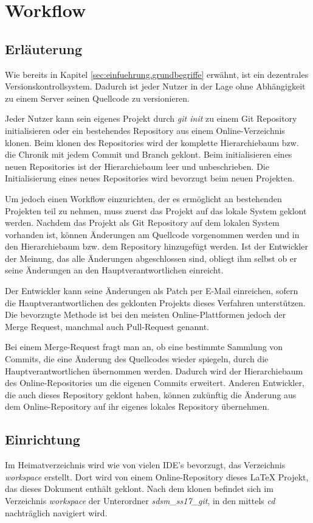 \section{Workflow}

\subsection{Erläuterung}
Wie bereits in Kapitel \ref*{sec:einfuehrung.grundbegriffe} erwähnt, ist ein dezentrales Versionskontrollsystem. Dadurch ist jeder Nutzer in der Lage ohne Abhängigkeit zu einem Server seinen Quellcode zu versionieren.

Jeder Nutzer kann sein eigenes Projekt durch \textit{git init} zu einem Git Repository initialisieren oder ein bestehendes Repository aus einem Online-Verzeichnis klonen. Beim klonen des Repositories wird der komplette Hierarchiebaum bzw. die Chronik mit jedem Commit und Branch geklont. Beim initialisieren eines neuen Repositories ist der Hierarchiebaum leer und unbeschrieben. Die Initialisierung eines neues Repositories wird bevorzugt beim neuen Projekten.

Um jedoch einen Workflow einzurichten, der es ermöglicht an bestehenden Projekten teil zu nehmen, muss zuerst das Projekt auf das lokale System geklont werden. Nachdem das Projekt als Git Repository auf dem lokalen System vorhanden ist, können Änderungen am Quellcode vorgenommen werden und in den Hierarchiebaum bzw. dem Repository hinzugefügt werden. Ist der Entwickler der Meinung, das alle Änderungen abgeschlossen sind, obliegt ihm selbst ob er seine Änderungen an den Hauptverantwortlichen einreicht. 

Der Entwickler kann seine Änderungen als Patch per E-Mail einreichen, sofern die Hauptverantwortlichen des geklonten Projekts dieses Verfahren unterstützen. Die bevorzugte Methode ist bei den meisten Online-Plattformen jedoch der Merge Request, manchmal auch Pull-Request genannt. 

Bei einem Merge-Request fragt man an, ob eine bestimmte Sammlung von Commits, die eine Änderung des Quellcodes wieder spiegeln, durch die Hauptverantwortlichen übernommen werden. Dadurch wird der Hierarchiebaum des Online-Repositories um die eigenen Commits erweitert. Anderen Entwickler, die auch dieses Repository geklont haben, können zukünftig die Änderung aus dem Online-Repository auf ihr eigenes lokales Repository übernehmen.  

\subsection{Einrichtung}
Im Heimatverzeichnis wird wie von vielen IDE's bevorzugt, das Verzeichnis \textit{workspace} erstellt. Dort wird von einem Online-Repository dieses \LaTeX{} Projekt, das dieses Dokument enthält geklont. Nach dem klonen befindet sich im Verzeichnis \textit{workspace} der Unterordner \textit{sdsm\_ss17\_git}, in den mittels \textit{cd} nachträglich navigiert wird.

